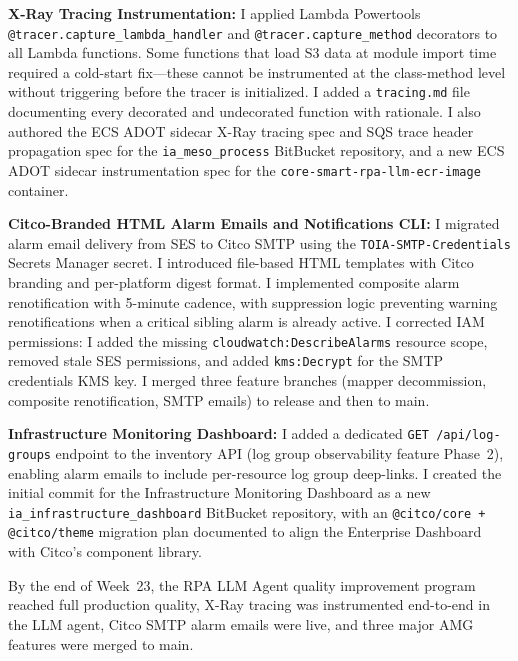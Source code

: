 \textbf{X-Ray Tracing Instrumentation:} 
I applied Lambda Powertools
\texttt{@tracer.capture\_lambda\_handler} and \texttt{@tracer.capture\_method}
decorators to all Lambda functions. Some functions that load S3 data at module import time required a cold-start
fix---these cannot be instrumented at the class-method level without triggering
before the tracer is initialized. I added a \texttt{tracing.md} file documenting every
decorated and undecorated function with rationale. I also authored the ECS ADOT
sidecar X-Ray tracing spec and SQS trace header propagation spec for the \texttt{ia\_meso\_process} BitBucket
repository, and a new ECS ADOT sidecar instrumentation spec for
the \texttt{core-smart-rpa-llm-ecr-image} container.

\textbf{Citco-Branded HTML Alarm Emails and Notifications CLI:} 
I migrated alarm email delivery from SES to Citco SMTP
using the \texttt{TOIA-SMTP-Credentials} Secrets Manager secret. I introduced file-based HTML templates with Citco branding and per-platform digest
format. I implemented composite alarm renotification with 5-minute cadence,
with suppression logic preventing warning renotifications when a critical
sibling alarm is already active. I corrected IAM permissions: I added the missing
\texttt{cloudwatch:DescribeAlarms} resource scope, removed stale SES permissions,
and added \texttt{kms:Decrypt} for the SMTP credentials KMS key.
I merged three feature branches (mapper decommission, composite renotification, SMTP
emails) to release and then to main.

\textbf{Infrastructure Monitoring Dashboard:} 
I added a dedicated \texttt{GET /api/log-groups}
endpoint to the inventory API (log group observability feature Phase~2), enabling alarm
emails to include per-resource log group deep-links. I created the initial commit for the Infrastructure Monitoring Dashboard as a new \texttt{ia\_infrastructure\_dashboard} BitBucket
repository, with an \texttt{@citco/core + @citco/theme} migration plan
documented to align the Enterprise Dashboard with Citco's component library.

By the end of Week~23, the RPA LLM Agent quality improvement program reached full production quality, X-Ray
tracing was instrumented end-to-end in the LLM agent, Citco SMTP alarm
emails were live, and three major AMG features were merged to main.


